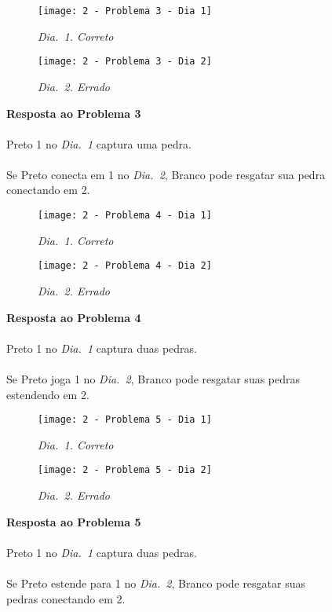 \begin{SCfigure}[][h!]
    \begin{subfigure}[t]{.31\textwidth}
        \texttt{[image: 2 - Problema 3 - Dia 1]}
        \caption*{\emph{Dia.\@~1. Correto}}
    \end{subfigure}
    \hfill
    \begin{subfigure}[t]{.31\textwidth}
        \texttt{[image: 2 - Problema 3 - Dia 2]}
        \caption*{\emph{Dia.\@~2. Errado}}
    \end{subfigure}
    \hfill
    \caption*{\textbf{Resposta ao Problema 3}\\\\Preto 1 no \emph{Dia.\@~1} captura uma pedra.\\\\Se Preto conecta em 1 no \emph{Dia.\@~2}, Branco pode resgatar sua pedra conectando em 2.}
\end{SCfigure}

\pagebreak

\begin{SCfigure}[][h!]
    \begin{subfigure}[t]{.31\textwidth}
        \texttt{[image: 2 - Problema 4 - Dia 1]}
        \caption*{\emph{Dia.\@~1. Correto}}
    \end{subfigure}
    \hfill
    \begin{subfigure}[t]{.31\textwidth}
        \texttt{[image: 2 - Problema 4 - Dia 2]}
        \caption*{\emph{Dia.\@~2. Errado}}
    \end{subfigure}
    \hfill
    \caption*{\textbf{Resposta ao Problema 4}\\\\Preto 1 no \emph{Dia.\@~1} captura duas pedras.\\\\Se Preto joga 1 no \emph{Dia.\@~2}, Branco pode resgatar suas pedras estendendo em 2.}
\end{SCfigure}

\vfill

\begin{SCfigure}[][h!]
    \begin{subfigure}[t]{.31\textwidth}
        \texttt{[image: 2 - Problema 5 - Dia 1]}
        \caption*{\emph{Dia.\@~1. Correto}}
    \end{subfigure}
    \hfill
    \begin{subfigure}[t]{.31\textwidth}
        \texttt{[image: 2 - Problema 5 - Dia 2]}
        \caption*{\emph{Dia.\@~2. Errado}}
    \end{subfigure}
    \hfill
    \caption*{\textbf{Resposta ao Problema 5}\\\\Preto 1 no \emph{Dia.\@~1} captura duas pedras.\\\\Se Preto estende para 1 no \emph{Dia.\@~2}, Branco pode resgatar suas pedras conectando em 2.}
\end{SCfigure}

